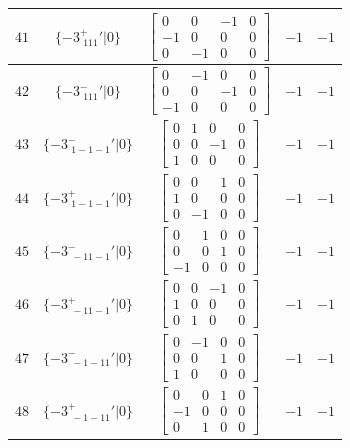 \documentclass[fleqn,8pt]{jsarticle}
\begin{document}
\begin{longtable}{ccccc}
$ 41 $ & $ \{-3^{+}_{\,\,111}{}'|0\} $ & $ \begin{bmatrix} 0 & 0 & -1 & 0 \\ -1 & 0 & 0 & 0 \\ 0 & -1 & 0 & 0 \end{bmatrix} $ & $ -1 $ & $ -1 $ \\ \hline
$ 42 $ & $ \{-3^{-}_{\,\,111}{}'|0\} $ & $ \begin{bmatrix} 0 & -1 & 0 & 0 \\ 0 & 0 & -1 & 0 \\ -1 & 0 & 0 & 0 \end{bmatrix} $ & $ -1 $ & $ -1 $ \\ \hline
$ 43 $ & $ \{-3^{-}_{\,\,1-1-1}{}'|0\} $ & $ \begin{bmatrix} 0 & 1 & 0 & 0 \\ 0 & 0 & -1 & 0 \\ 1 & 0 & 0 & 0 \end{bmatrix} $ & $ -1 $ & $ -1 $ \\ \hline
$ 44 $ & $ \{-3^{+}_{\,\,1-1-1}{}'|0\} $ & $ \begin{bmatrix} 0 & 0 & 1 & 0 \\ 1 & 0 & 0 & 0 \\ 0 & -1 & 0 & 0 \end{bmatrix} $ & $ -1 $ & $ -1 $ \\ \hline
$ 45 $ & $ \{-3^{-}_{\,\,-11-1}{}'|0\} $ & $ \begin{bmatrix} 0 & 1 & 0 & 0 \\ 0 & 0 & 1 & 0 \\ -1 & 0 & 0 & 0 \end{bmatrix} $ & $ -1 $ & $ -1 $ \\ \hline
$ 46 $ & $ \{-3^{+}_{\,\,-11-1}{}'|0\} $ & $ \begin{bmatrix} 0 & 0 & -1 & 0 \\ 1 & 0 & 0 & 0 \\ 0 & 1 & 0 & 0 \end{bmatrix} $ & $ -1 $ & $ -1 $ \\ \hline
$ 47 $ & $ \{-3^{-}_{\,\,-1-11}{}'|0\} $ & $ \begin{bmatrix} 0 & -1 & 0 & 0 \\ 0 & 0 & 1 & 0 \\ 1 & 0 & 0 & 0 \end{bmatrix} $ & $ -1 $ & $ -1 $ \\ \hline
$ 48 $ & $ \{-3^{+}_{\,\,-1-11}{}'|0\} $ & $ \begin{bmatrix} 0 & 0 & 1 & 0 \\ -1 & 0 & 0 & 0 \\ 0 & 1 & 0 & 0 \end{bmatrix} $ & $ -1 $ & $ -1 $ \\
\end{longtable}
\end{document}
